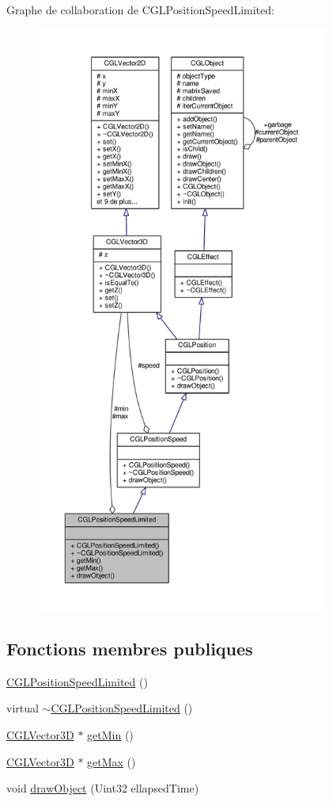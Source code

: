 Graphe de collaboration de C\-G\-L\-Position\-Speed\-Limited\-:
\nopagebreak
\begin{figure}[H]
\begin{center}
\leavevmode
\includegraphics[height=550pt]{d4/dd9/class_c_g_l_position_speed_limited__coll__graph}
\end{center}
\end{figure}
\subsection*{Fonctions membres publiques}
\begin{DoxyCompactItemize}
\item 
\hyperlink{class_c_g_l_position_speed_limited_ab0c7bdecd733b5b0cecaf4601ad411eb}{C\-G\-L\-Position\-Speed\-Limited} ()
\item 
virtual \hyperlink{class_c_g_l_position_speed_limited_ac43d6c91ec32e9bf2f1f40bed62875fe}{$\sim$\-C\-G\-L\-Position\-Speed\-Limited} ()
\item 
\hyperlink{class_c_g_l_vector3_d}{C\-G\-L\-Vector3\-D} $\ast$ \hyperlink{class_c_g_l_position_speed_limited_afb00ae5df682b4a85562792bdcedc2de}{get\-Min} ()
\item 
\hyperlink{class_c_g_l_vector3_d}{C\-G\-L\-Vector3\-D} $\ast$ \hyperlink{class_c_g_l_position_speed_limited_adb68a3c658e90b2e3f26c7643f5751d1}{get\-Max} ()
\item 
void \hyperlink{class_c_g_l_position_speed_limited_ae1885ea6f4e606d674d720b432a0fdfd}{draw\-Object} (Uint32 ellapsed\-Time)
\end{DoxyCompactItemize}
